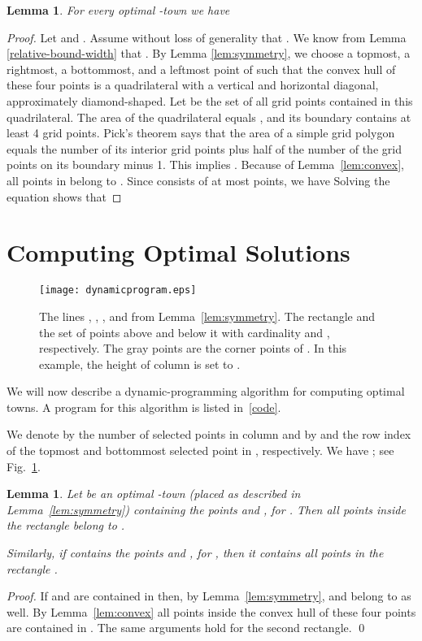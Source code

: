 \documentclass[preprint,authoryear,12pt]{elsarticle}
\newtheorem{lemma}[theorem]{Lemma}
\begin{document}
\begin{lemma}
\label{bounded-width} For every optimal -town we have

\end{lemma}

\begin{proof}
Let  and . Assume without loss of generality
that .
We know from Lemma
\ref{relative-bound-width} that .
By Lemma \ref{lem:symmetry}, we choose a topmost, a rightmost,
a bottommost, and a leftmost point of  such that the convex hull
of these four points is a quadrilateral with a vertical and horizontal diagonal,
approximately diamond-shaped.
Let  be the set of all grid points contained in this quadrilateral.
The area of the quadrilateral equals , and its boundary
contains at least 4 grid points.
Pick's theorem says that the area of a simple grid polygon equals
the number of its interior grid points  plus half of the number of
the grid points  on its boundary minus 1.
This implies .
Because of Lemma~\ref{lem:convex}, all points in  belong to .
Since  consists of at most  points, we have
 Solving the equation
  shows that

\end{proof}

\section{Computing Optimal Solutions}\label{sec:optimal}
\begin{figure}[tb]
\begin{center}
\texttt{[image: dynamicprogram.eps]} \caption{The
lines , , , and  from Lemma~\ref{lem:symmetry}.
The rectangle  and the set of points above and below it with
cardinality  and , respectively. The gray points are the
corner points of . In this example, the height  of column
 is set to .} \label{fig:dynamicprogram}
\end{center}
\end{figure}

We will now describe a dynamic-programming algorithm for computing
optimal towns. A program for this algorithm is listed
in~\ref{code}.

We denote by  the number of selected points in column 
and by  and  the row index of the topmost and
bottommost selected point in , respectively. We have ; see Fig.~\ref{fig:dynamicprogram}.


\begin{lemma}\label{lem:rectangle}
Let  be an optimal -town \textup(placed as described in
Lemma~\ref{lem:symmetry}\textup) containing the points  and
, for . Then all points inside the rectangle
 belong to .

Similarly, if  contains
the points  and , for , then it contains all
points in the rectangle
.
\end{lemma}
\begin{proof}
If  and  are contained in  then, by
Lemma~\ref{lem:symmetry},  and  belong
to  as well. By Lemma~\ref{lem:convex} all points inside the
convex hull of these four points are contained in . The same
arguments hold for the second rectangle.  \qed
\end{proof}
\end{document}
